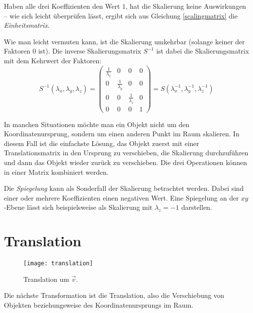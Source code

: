 Haben alle drei Koeffizienten den Wert $1$, hat die Skalierung keine Auswirkungen -- wie sich leicht überprüfen lässt, ergibt sich aus Gleichung \ref{scalingmatrix} die \emph{Einheitsmatrix}.

Wie man leicht vermuten kann, ist die Skalierung umkehrbar (solange keiner der Faktoren 0 ist). Die inverse Skalierungsmatrix $S^{-1}$ ist dabei die Skalierungsmatrix mit dem Kehrwert der Faktoren:
\begin{equation}
 S^{-1}{(\lambda_x, \lambda_y, \lambda_z)} =
 \begin{pmatrix}
  \frac{1}{\lambda_x} & 0 & 0 & 0 \\
  0 & \frac{1}{\lambda_y} & 0 & 0 \\
  0 & 0 & \frac{1}{\lambda_z} & 0 \\
  0 & 0 & 0 & 1
 \end{pmatrix}
 = S{(\lambda_x^{-1}, \lambda_y^{-1}, \lambda_z^{-1})}
\end{equation}


In manchen Situationen möchte man ein Objekt nicht um den Koordinatenursprung, sondern um einen anderen Punkt im Raum skalieren. In diesem Fall ist die einfachste Lösung, das Objekt zuerst mit einer Translationsmatrix in den Ursprung zu verschieben, die Skalierung durchzuführen und dann das Objekt wieder zurück zu verschieben. Die drei Operationen können in einer Matrix kombiniert werden.


Die \emph{Spiegelung} kann als Sonderfall der Skalierung betrachtet werden. Dabei sind einer oder mehrere Koeffizienten einen negativen Wert. Eine Spiegelung an der $xy$-Ebene lässt sich beispielsweise als Skalierung mit $\lambda_z = -1$ darstellen.

\section{Translation}
\label{translation}

\begin{wrapfigure}{r}{0.5\textwidth}
  \texttt{[image: translation]}
  \vspace{-15pt}
  \caption{Translation um $\vec v$.}
\end{wrapfigure}

Die nächste Transformation ist die Translation, also die Verschiebung von Objekten beziehungsweise des Koordinatenursprungs im Raum.

